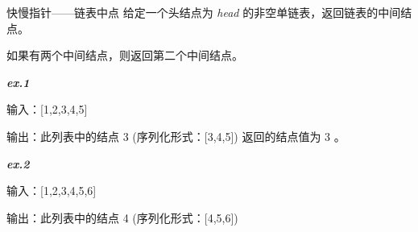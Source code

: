 
\begin{example}{快慢指针——链表中点}
给定一个头结点为 \textsl{head} 的非空单链表，返回链表的中间结点。

如果有两个中间结点，则返回第二个中间结点。

\textbf{\textsl{ex.1}}

输入：[1,2,3,4,5] 

输出：此列表中的结点 3 (序列化形式：[3,4,5])
返回的结点值为 3 。

\textbf{\textsl{ex.2}}

输入：[1,2,3,4,5,6]

输出：此列表中的结点 4 (序列化形式：[4,5,6])
\end{example}